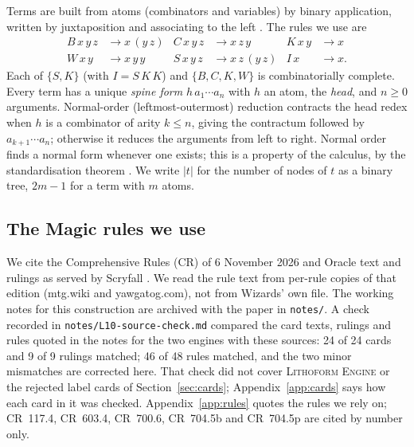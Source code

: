 \documentclass[11pt]{article}
\theoremstyle{definition}
\newcommand{\card}[1]{{\mdseries\scshape #1}}
\newcommand{\CR}[1]{CR~#1}
\begin{document}
Terms are built from atoms (combinators and variables) by binary application, written by
juxtaposition and associating to the left \citep{schonfinkel1924,curryfeys1958}. The
rules we use are
\begin{align*}
  B\,x\,y\,z &\to x\,(y\,z) & C\,x\,y\,z &\to x\,z\,y & K\,x\,y &\to x\\
  W\,x\,y &\to x\,y\,y & S\,x\,y\,z &\to x\,z\,(y\,z) & I\,x &\to x .
\end{align*}
Each of $\{S,K\}$ (with $I = S\,K\,K$) and $\{B,C,K,W\}$ is combinatorially complete.
Every term has a unique \emph{spine form} $h\,a_1\cdots a_n$ with $h$ an atom, the
\emph{head}, and $n \ge 0$ arguments. Normal-order (leftmost-outermost) reduction
contracts the head redex when $h$ is a combinator of arity $k \le n$, giving the
contractum followed by $a_{k+1}\cdots a_n$; otherwise it reduces the arguments from left
to right. Normal order finds a normal form whenever one exists; this is a property of the
calculus, by the standardisation theorem \citep{curryfeys1958}. We write $|t|$ for the
number of nodes of $t$ as a binary tree, $2m-1$ for a term with $m$ atoms.

\subsection{The Magic rules we use}

We cite the Comprehensive Rules (CR) of 6 November 2026 \citep{cr2026} and Oracle text and
rulings as served by Scryfall \citep{scryfall}. We read the rule text from per-rule copies
of that edition (mtg.wiki and yawgatog.com), not from Wizards' own file. The working notes
for this construction are archived with the paper in \texttt{notes/}. A check recorded in
\texttt{notes/L10-source-check.md} compared the card texts, rulings and rules quoted in
the notes for the two engines with these sources: 24 of 24 cards and 9 of 9 rulings
matched; 46 of 48 rules matched, and the two minor mismatches are corrected here. That
check did not cover \card{Lithoform Engine} or the rejected label cards of
Section~\ref{sec:cards}; Appendix~\ref{app:cards} says how each card in it was checked.
Appendix~\ref{app:rules} quotes the rules we rely on; \CR{117.4}, \CR{603.4}, \CR{700.6},
\CR{704.5b} and \CR{704.5p} are cited by number only.
\end{document}
